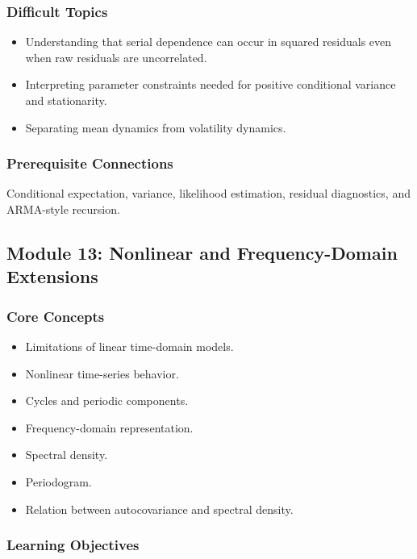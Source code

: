 \documentclass[11pt]{article}
\begin{document}
\subsubsection{Difficult Topics}

\begin{itemize}
    \item Understanding that serial dependence can occur in squared residuals
    even when raw residuals are uncorrelated.
    \item Interpreting parameter constraints needed for positive conditional
    variance and stationarity.
    \item Separating mean dynamics from volatility dynamics.
\end{itemize}

\subsubsection{Prerequisite Connections}

Conditional expectation, variance, likelihood estimation, residual diagnostics,
and ARMA-style recursion.

\subsection{Module 13: Nonlinear and Frequency-Domain Extensions}

\subsubsection{Core Concepts}

\begin{itemize}
    \item Limitations of linear time-domain models.
    \item Nonlinear time-series behavior.
    \item Cycles and periodic components.
    \item Frequency-domain representation.
    \item Spectral density.
    \item Periodogram.
    \item Relation between autocovariance and spectral density.
\end{itemize}

\subsubsection{Learning Objectives}
\end{document}
